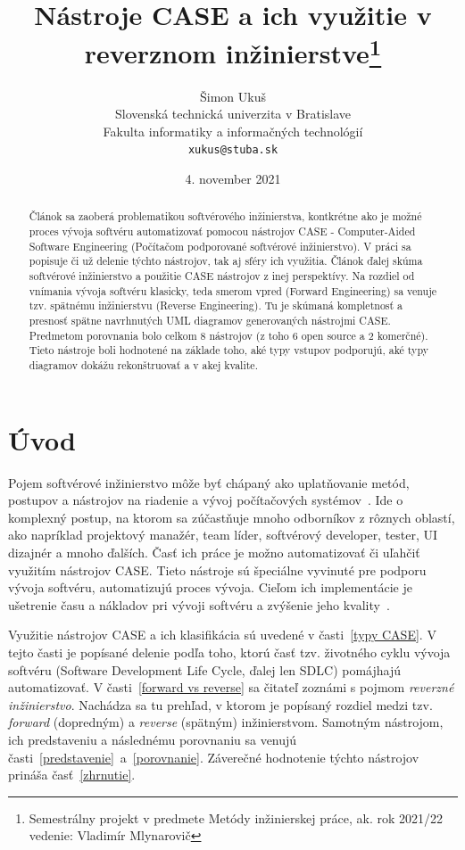 \documentclass[10pt,twoside,slovak,a4paper]{article}
\title{Nástroje CASE a ich využitie v reverznom inžinierstve\thanks{Semestrálny projekt v predmete Metódy inžinierskej práce, ak. rok 2021/22 vedenie: Vladimír Mlynarovič}} %
\author{Šimon Ukuš\\[2pt]
	{\small Slovenská technická univerzita v Bratislave}\\
	{\small Fakulta informatiky a informačných technológií}\\
	{\small \texttt{xukus@stuba.sk}}
	}
\date{\small 4. november 2021}
\begin{document}
\maketitle

\begin{abstract}
Článok sa zaoberá problematikou softvérového inžinierstva, kontkrétne ako je možné proces vývoja softvéru automatizovať pomocou nástrojov CASE - Computer-Aided Software Engineering (Počítačom podporované softvérové inžinierstvo). V práci sa popisuje či už delenie týchto nástrojov,  tak aj sféry ich využitia.  Článok ďalej skúma softvérové inžinierstvo a použitie CASE nástrojov z inej perspektívy.  Na rozdiel od vnímania vývoja softvéru klasicky, teda smerom vpred (Forward Engineering) sa venuje tzv. spätnému inžinierstvu (Reverse Engineering). Tu je skúmaná kompletnosť a presnosť spätne navrhnutých UML diagramov generovaných nástrojmi CASE. Predmetom porovnania bolo celkom 8 nástrojov (z toho 6 open source a 2 komerčné). Tieto nástroje boli hodnotené na základe toho, aké typy vstupov podporujú, aké typy diagramov dokážu rekonštruovať a v akej kvalite.
 
\end{abstract}



\section{Úvod}
Pojem softvérové inžinierstvo môže byť chápaný ako uplatňovanie metód, postupov a nástrojov na riadenie a vývoj počítačových systémov~\cite{1985}. Ide o komplexný postup, na ktorom sa zúčastňuje mnoho odborníkov z rôznych oblastí, ako napríklad projektový manažér, team líder, softvérový developer, tester, UI dizajnér a mnoho ďalších. Časť ich práce je možno automatizovať či uľahčiť využitím nástrojov CASE. Tieto nástroje sú špeciálne vyvinuté pre podporu vývoja softvéru, automatizujú proces vývoja. Cieľom ich implementácie je ušetrenie času a nákladov pri vývoji softvéru a zvýšenie jeho kvality~\cite{Osama:Adoption}.

Využitie nástrojov CASE a ich klasifikácia sú uvedené v časti~\ref{typy CASE}. V tejto časti je popísané delenie podľa toho, ktorú časť tzv. životného cyklu vývoja softvéru (Software Development Life Cycle, ďalej len SDLC) pomájhajú automatizovať. 
V časti~\ref{forward vs reverse} sa čitateľ zoznámi s pojmom \emph{reverzné inžinierstvo}. Nachádza sa tu prehľad, v ktorom je popísaný rozdiel medzi tzv. \emph{forward} (dopredným) a \emph{reverse} (spätným) inžinierstvom. 
Samotným nástrojom, ich predstaveniu a následnému porovnaniu sa venujú časti~\ref{predstavenie}~a~\ref{porovnanie}.
Záverečné hodnotenie týchto nástrojov prináša časť~\ref{zhrnutie}.
\end{document}
